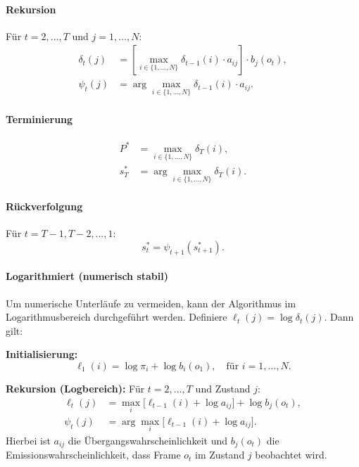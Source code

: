 \paragraph{Rekursion}
Für $t = 2, \ldots, T$ und $j = 1, \ldots, N$:
\begin{align}
  \delta_t(j) &= \left[ \max_{i \in \{1, \ldots, N\}} \delta_{t-1}(i) \cdot a_{ij} \right] \cdot b_j(o_t), \\
  \psi_t(j)   &= \arg\max_{i \in \{1, \ldots, N\}} \delta_{t-1}(i) \cdot a_{ij}.
\end{align}

\paragraph{Terminierung}
\begin{align}
  P^*   &= \max_{i \in \{1, \ldots, N\}} \delta_T(i), \\
  s_T^* &= \arg\max_{i \in \{1, \ldots, N\}} \delta_T(i).
\end{align}

\paragraph{Rückverfolgung}
Für $t = T-1, T-2, \ldots, 1$:
\begin{equation}
  s_t^* = \psi_{t+1}(s_{t+1}^*).
\end{equation}

\paragraph{Logarithmiert (numerisch stabil)}
Um numerische Unterläufe zu vermeiden, kann der Algorithmus im Logarithmusbereich durchgeführt werden.
Definiere $\ell_t(j) = \log \delta_t(j)$. Dann gilt:

\textbf{Initialisierung:}
\begin{equation}
  \ell_1(i) = \log \pi_i + \log b_i(o_1), \quad \text{für } i = 1, \ldots, N.
\end{equation}

\textbf{Rekursion (Logbereich):} 
Für $t = 2, \ldots, T$ und Zustand $j$:
\begin{equation}
\begin{aligned}
  \ell_t(j) &= \max_{i} \bigl[\ell_{t-1}(i) + \log a_{ij}\bigr] + \log b_j(o_t), \\
  \psi_t(j) &= \arg\max_{i} \bigl[\ell_{t-1}(i) + \log a_{ij}\bigr].
\end{aligned}
\end{equation}
Hierbei ist $a_{ij}$ die Übergangswahrscheinlichkeit und $b_j(o_t)$ die Emissionswahrscheinlichkeit, dass Frame $o_t$ im Zustand $j$ beobachtet wird.

